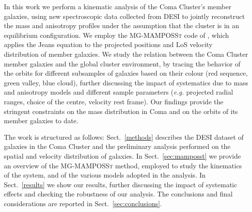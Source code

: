 \documentclass{aa}
\begin{document}
 
\medskip
In this work we perform a kinematic analysis of the Coma Cluster's member galaxies, using new spectroscopic data collected from DESI \citep[Dark Energy Spectroscopic Instrument,][]{DESI_DR1} to jointly reconstruct the mass and anisotropy profiles %
under the assumption that the cluster is in an equilibrium configuration. We employ the \textsc{MG-MAMPOSSt} code of \cite{Pizzuti_2021}, which applies the Jeans equation to the projected positions and LoS velocity distribution of member galaxies. 
We study the relation between the Coma Cluster member galaxies and the global cluster environment, by tracing the behavior of the orbits for different subsamples of galaxies based on their colour (red sequence, green valley, blue cloud), further discussing the impact of systematics due to mass and anisotropy models and different  sample parameters (\textit{e.g.} projected radial ranges, choice of the centre, velocity rest frame).
Our findings provide the stringent constraints on the mass distribution in Coma and on the orbits of its member galaxies to date.

The work is structured as follows: Sect.~\ref{methods} describes the DESI dataset of galaxies in the Coma Cluster and the preliminary analysis performed on the spatial and velocity distribution of galaxies. In Sect.~\ref{sec:mamposst} we provide an overview of the \textsc{MG-MAMPOSSt} method, employed to study the kinematics of the system, and of the various models adopted in the analysis. In Sect.~\ref{results} we show our results, further discussing the impact of systematic effects and checking the robustness of our analysis. The conclusions and final considerations are reported in Sect.~\ref{sec:conclusions}. 
\end{document}
